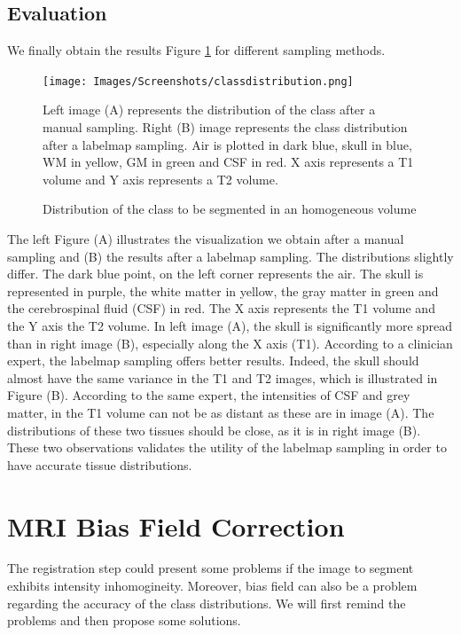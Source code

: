 \subsection{Evaluation}
\par 
We finally obtain the results Figure \ref{fig:intensitynormalization} for different sampling methods.
\begin{figure}\centering\label{classdistribution}
  \texttt{[image: Images/Screenshots/classdistribution.png]}
  \caption{Distribution of the class to be segmented in an homogeneous volume}{Left image (A) represents the distribution of the class after a manual sampling. Right (B) image represents the class distribution after a labelmap sampling. Air is plotted in dark blue, skull in blue, WM in yellow, GM in green and CSF in red. X axis represents a T1 volume and Y axis represents a T2 volume.}\label{fig:intensitynormalization}
 \end{figure}
The left Figure (A) illustrates the visualization we obtain after a manual sampling and (B) the results after a labelmap sampling. The distributions slightly differ. The dark blue point, on the left corner represents the air. The skull is represented in purple, the white matter in yellow, the gray matter in green and the cerebrospinal fluid (CSF) in red. The X axis represents the T1 volume and the Y axis the T2 volume. In left image (A), the skull is significantly more spread than in right image (B), especially along the X axis (T1). According to a clinician expert, the labelmap sampling offers better results. Indeed, the skull should almost have the same variance in the T1 and T2 images, which is illustrated in Figure (B). According to the same expert, the intensities of CSF and grey matter, in the T1 volume can not be as distant as these are in image (A). The distributions of these two tissues should be close, as it is in right image (B). These two observations validates the utility of the labelmap sampling in order to have accurate tissue distributions.


\section{MRI Bias Field Correction}\label{biasfieldcorrectionregistration}

The registration step could present some problems if the image to segment exhibits intensity inhomogineity. Moreover, bias field can also be a problem regarding the accuracy of the class distributions. We will first remind the problems and then propose some solutions.

